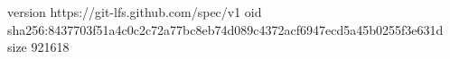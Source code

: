 version https://git-lfs.github.com/spec/v1
oid sha256:8437703f51a4c0c2c72a77bc8eb74d089c4372acf6947ecd5a45b0255f3e631d
size 921618
